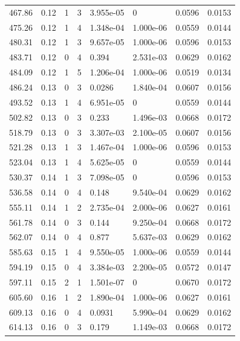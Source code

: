 \documentclass[preview]{standalone}
\begin{document}
{{\begin{tabular}{L{1.2cm}C{1.2cm} C{0.3cm}C{0.5cm} C{1.4cm}C{1.4cm} C{1.4cm}C{1.4cm}}
  467.86  &  0.12  & 1     &  3 &  3.955e-05  & 0  & 0.0596 &  0.0153   \\ 
  475.26  &  0.12  & 1     &  4 &  1.348e-04  & 1.000e-06  & 0.0559 &  0.0144   \\ 
  480.31  &  0.12  & 1     &  3 &  9.657e-05  & 1.000e-06  & 0.0596 &  0.0153   \\ 
  483.71  &  0.12  & 0     &  4 &  0.394  & 2.531e-03  & 0.0629 &  0.0162   \\ 
  484.09  &  0.12  & 1     &  5 &  1.206e-04  & 1.000e-06  & 0.0519 &  0.0134   \\ 
  486.24  &  0.13  & 0     &  3 &  0.0286  & 1.840e-04  & 0.0607 &  0.0156   \\ 
  493.52  &  0.13  & 1     &  4 &  6.951e-05  & 0  & 0.0559 &  0.0144   \\ 
  502.82  &  0.13  & 0     &  3 &  0.233  & 1.496e-03  & 0.0668 &  0.0172   \\ 
  518.79  &  0.13  & 0     &  3 &  3.307e-03  & 2.100e-05  & 0.0607 &  0.0156   \\ 
  521.28  &  0.13  & 1     &  3 &  1.467e-04  & 1.000e-06  & 0.0596 &  0.0153   \\ 
  523.04  &  0.13  & 1     &  4 &  5.625e-05  & 0  & 0.0559 &  0.0144   \\ 
  530.37  &  0.14  & 1     &  3 &  7.098e-05  & 0  & 0.0596 &  0.0153   \\ 
  536.58  &  0.14  & 0     &  4 &  0.148  & 9.540e-04  & 0.0629 &  0.0162   \\ 
  555.11  &  0.14  & 1     &  2 &  2.735e-04  & 2.000e-06  & 0.0627 &  0.0161   \\ 
  561.78  &  0.14  & 0     &  3 &  0.144  & 9.250e-04  & 0.0668 &  0.0172   \\ 
  562.07  &  0.14  & 0     &  4 &  0.877  & 5.637e-03  & 0.0629 &  0.0162   \\ 
  585.63  &  0.15  & 1     &  4 &  9.550e-05  & 1.000e-06  & 0.0559 &  0.0144   \\ 
  594.19  &  0.15  & 0     &  4 &  3.384e-03  & 2.200e-05  & 0.0572 &  0.0147   \\ 
  597.11  &  0.15  & 2     &  1 &  1.501e-07  & 0  & 0.0670 &  0.0172   \\ 
  605.60  &  0.16  & 1     &  2 &  1.890e-04  & 1.000e-06  & 0.0627 &  0.0161   \\ 
  609.13  &  0.16  & 0     &  4 &  0.0931  & 5.990e-04  & 0.0629 &  0.0162   \\ 
  614.13  &  0.16  & 0     &  3 &  0.179  & 1.149e-03  & 0.0668 &  0.0172   \\ 

\end{tabular}}}
\end{document}
